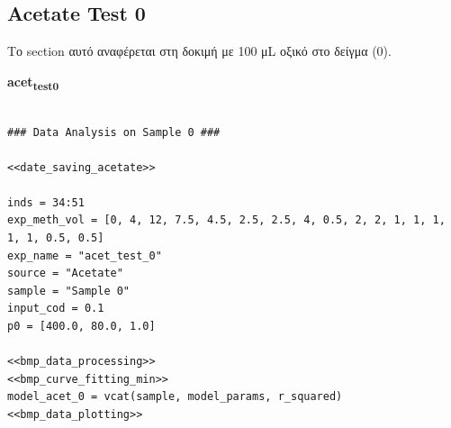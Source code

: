 \documentclass[11pt]{article}
\begin{document}
\subsection{Acetate Test 0}
\label{sec:org40c66a9}
Το section αυτό αναφέρεται στη δοκιμή με 100 μL οξικό στο δείγμα (0).

\textbf{acet\textsubscript{test}\textsubscript{0}}
\begin{verbatim}

### Data Analysis on Sample 0 ###

<<date_saving_acetate>>

inds = 34:51
exp_meth_vol = [0, 4, 12, 7.5, 4.5, 2.5, 2.5, 4, 0.5, 2, 2, 1, 1, 1, 1, 1, 0.5, 0.5]
exp_name = "acet_test_0"
source = "Acetate"
sample = "Sample 0"
input_cod = 0.1
p0 = [400.0, 80.0, 1.0]

<<bmp_data_processing>>
<<bmp_curve_fitting_min>>
model_acet_0 = vcat(sample, model_params, r_squared)
<<bmp_data_plotting>>
\end{verbatim}
\end{document}

